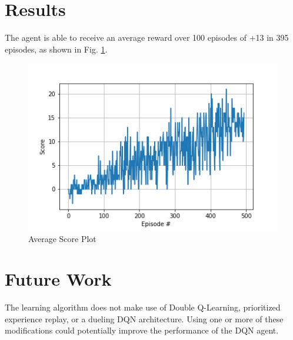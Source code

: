 \documentclass{article}
\begin{document}
\section{Results}
The agent is able to receive an average reward over 100 episodes of +13 in 395 episodes, as shown in Fig. \ref{fig:results}.

\begin{figure}[ht]
\centering
\includegraphics[scale=0.75]{./figures/results.png}
\caption{Average Score Plot}
\label{fig:results}
\end{figure}

\section{Future Work}
The learning algorithm does not make use of Double Q-Learning, prioritized experience replay, or a dueling DQN architecture. Using one or more of these modifications could potentially improve the performance of the DQN agent. 



\end{document}
